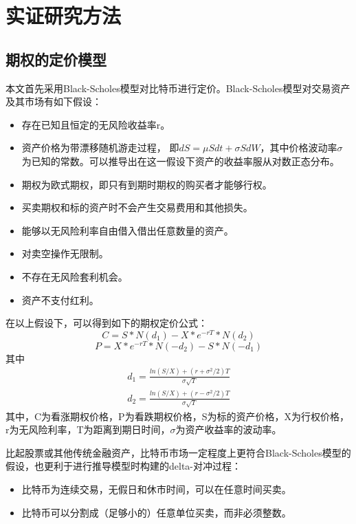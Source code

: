 \chapter{实证研究方法}\label{research_method}
    \section{期权的定价模型}
    本文首先采用Black-Scholes模型对比特币进行定价。Black-Scholes模型对交易资产及其市场有如下假设：
    \begin{itemize}
        \item 存在已知且恒定的无风险收益率r。
        \item 资产价格为带漂移随机游走过程， 即$dS={\mu}Sdt+{\sigma}SdW$，其中价格波动率$\sigma$为已知的常数。可以推导出在这一假设下资产的收益率服从对数正态分布。
        \item 期权为欧式期权，即只有到期时期权的购买者才能够行权。
        \item 买卖期权和标的资产时不会产生交易费用和其他损失。
        \item 能够以无风险利率自由借入借出任意数量的资产。
        \item 对卖空操作无限制。
        \item 不存在无风险套利机会。
        \item 资产不支付红利。
    \end{itemize}
    在以上假设下，可以得到如下的期权定价公式：
    \begin{equation}\label{bs-call}
            C=S*N(d_1)-X*e^{-rT}*N(d_2) 
    \end{equation}
    \begin{equation}\label{bs-put}
        P=X*e^{-rT}*N(-d_2)-S*N(-d_1)
    \end{equation}
    其中
    \begin{equation*}
        \begin{split}
        d_1=\frac{ln(S/X)+(r+\sigma^2/2)T}{\sigma{\sqrt{T}}} \\
        d_2=\frac{ln(S/X)+(r-\sigma^2/2)T}{\sigma{\sqrt{T}}}
        \end{split}
    \end{equation*}
    其中，C为看涨期权价格，P为看跌期权价格，S为标的资产价格，X为行权价格，r为无风险利率，T为距离到期日时间，$\sigma$为资产收益率的波动率。
    
        比起股票或其他传统金融资产，比特币市场一定程度上更符合Black-Scholes模型的假设，也更利于进行推导模型时构建的delta-对冲过程：
        \begin{itemize}
            \item 比特币为连续交易，无假日和休市时间，可以在任意时间买卖。
            \item 比特币可以分割成（足够小的）任意单位买卖，而非必须整数。
        \end{itemize}


